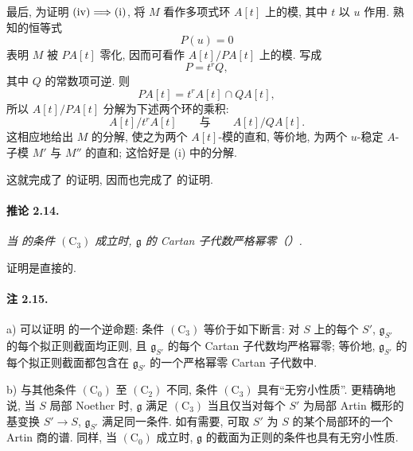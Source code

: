 最后, 为证明 \(\textup{(iv)}\Longrightarrow\textup{(i)}\), 将 \(M\) 看作多项式环 \(A[t]\) 上的模, 其中 \(t\) 以 \(u\) 作用. 熟知的恒等式
\[
  P(u)=0
\]
表明 \(M\) 被 \(P A[t]\) 零化, 因而可看作 \(A[t]/P A[t]\) 上的模. 写成
\[
  P=t^rQ,
\]
其中 \(Q\) 的常数项可逆. 则
\[
  P A[t]=t^rA[t]\cap Q A[t],
\]
所以 \(A[t]/P A[t]\) 分解为下述两个环的乘积:
\[
  A[t]/t^rA[t]
  \qquad\text{与}\qquad
  A[t]/Q A[t].
\]
这相应地给出 \(M\) 的分解, 使之为两个 \(A[t]\)-模的直和, 等价地, 为两个 \(u\)-稳定 \(A\)-子模 \(M'\) 与 \(M''\) 的直和; 这恰好是 \textup{(i)} 中的分解.

这就完成了  的证明, 因而也完成了  的证明.



\paragraph{\textbf{推论 2.14.}}
\emph{当  的条件 \((\mathrm C_3)\) 成立时, \(\mathfrak g\) 的 Cartan 子代数严格幂零\textup{（）}.}

证明是直接的.

\paragraph{\textbf{注 2.15.}}
\noindent
\textup{a)}
可以证明  的一个逆命题: 条件 \((\mathrm C_3)\) 等价于如下断言: 对 \(S\) 上的每个 \(S'\), \(\mathfrak g_{S'}\) 的每个拟正则截面均正则, 且 \(\mathfrak g_{S'}\) 的每个 Cartan 子代数均严格幂零; 等价地, \(\mathfrak g_{S'}\) 的每个拟正则截面都包含在 \(\mathfrak g_{S'}\) 的一个严格幂零 Cartan 子代数中.

\smallskip
\noindent
\textup{b)}
与其他条件 \((\mathrm C_0)\) 至 \((\mathrm C_2)\) 不同, 条件 \((\mathrm C_3)\) 具有“无穷小性质”. 更精确地说, 当 \(S\) 局部 Noether 时, \(\mathfrak g\) 满足 \((\mathrm C_3)\) 当且仅当对每个 \(S'\) 为局部 Artin 概形的基变换 \(S'\to S\), \(\mathfrak g_{S'}\) 满足同一条件. 如有需要, 可取 \(S'\) 为 \(S\) 的某个局部环的一个 Artin 商的谱. 同样, 当 \((\mathrm C_0)\) 成立时, \(\mathfrak g\) 的截面为正则的条件也具有无穷小性质.

